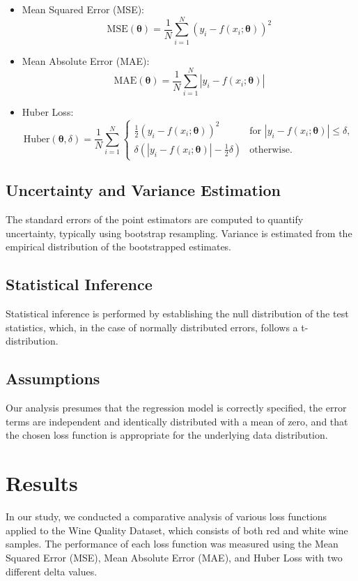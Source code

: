 \documentclass[12pt]{article}
\begin{document}
\begin{itemize}
  \item Mean Squared Error (MSE):
  \[ \text{MSE}(\boldsymbol{\theta}) = \frac{1}{N} \sum_{i=1}^{N} (y_i - f(x_i; \boldsymbol{\theta}))^2 \]
  \item Mean Absolute Error (MAE):
  \[ \text{MAE}(\boldsymbol{\theta}) = \frac{1}{N} \sum_{i=1}^{N} \left| y_i - f(x_i; \boldsymbol{\theta}) \right| \]
  \item Huber Loss:
  \[ \text{Huber}(\boldsymbol{\theta}, \delta) = \frac{1}{N} \sum_{i=1}^{N} \begin{cases} 
    \frac{1}{2}(y_i - f(x_i; \boldsymbol{\theta}))^2 & \text{for } |y_i - f(x_i; \boldsymbol{\theta})| \le \delta, \\
    \delta (|y_i - f(x_i; \boldsymbol{\theta})| - \frac{1}{2}\delta) & \text{otherwise}.
  \end{cases} \]
\end{itemize}

\subsection{Uncertainty and Variance Estimation}
The standard errors of the point estimators are computed to quantify uncertainty, typically using bootstrap resampling. Variance is estimated from the empirical distribution of the bootstrapped estimates.

\subsection{Statistical Inference}
Statistical inference is performed by establishing the null distribution of the test statistics, which, in the case of normally distributed errors, follows a t-distribution.

\subsection{Assumptions}
Our analysis presumes that the regression model is correctly specified, the error terms are independent and identically distributed with a mean of zero, and that the chosen loss function is appropriate for the underlying data distribution.

\section{Results}

In our study, we conducted a comparative analysis of various loss functions applied to the Wine Quality Dataset, which consists of both red and white wine samples. The performance of each loss function was measured using the Mean Squared Error (MSE), Mean Absolute Error (MAE), and Huber Loss with two different delta values.
\end{document}
